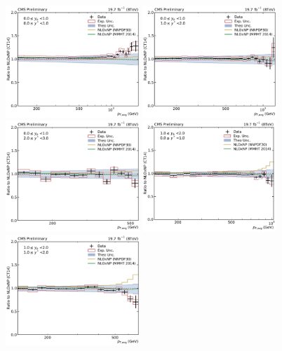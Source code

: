 \begin{figure}[htbp]
    \centering
    \includegraphics[width=0.45\textwidth]{figures/measurement/ratio_to_Ct14nlo+np_totcomp_yb0ys0.pdf}\hfill
    \includegraphics[width=0.45\textwidth]{figures/measurement/ratio_to_Ct14nlo+np_totcomp_yb0ys1.pdf}
    \includegraphics[width=0.45\textwidth]{figures/measurement/ratio_to_Ct14nlo+np_totcomp_yb0ys2.pdf}\hfill
    \includegraphics[width=0.45\textwidth]{figures/measurement/ratio_to_Ct14nlo+np_totcomp_yb1ys0.pdf}
    \includegraphics[width=0.45\textwidth]{figures/measurement/ratio_to_Ct14nlo+np_totcomp_yb1ys1.pdf}\hfill

\end{figure}
